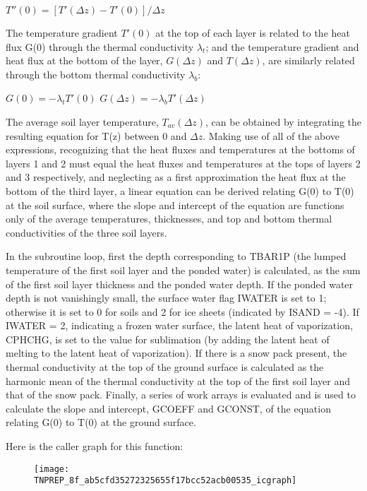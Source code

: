 $T''(0) = [T'(\Delta z) - T'(0)]/ \Delta z$

The temperature gradient $T'(0)$ at the top of each layer is related to the heat flux G(0) through the thermal conductivity $\lambda_t$; and the temperature gradient and heat flux at the bottom of the layer, $G(\Delta z)$ and $T(\Delta z)$, are similarly related through the bottom thermal conductivity $\lambda_b$\+:

$G(0) = - \lambda_t T'(0)$ $G(\Delta z) = - \lambda_b T'(\Delta z)$

The average soil layer temperature, $T_{av}(\Delta z)$, can be obtained by integrating the resulting equation for T(z) between 0 and $\Delta z$. Making use of all of the above expressions, recognizing that the heat fluxes and temperatures at the bottoms of layers 1 and 2 must equal the heat fluxes and temperatures at the tops of layers 2 and 3 respectively, and neglecting as a first approximation the heat flux at the bottom of the third layer, a linear equation can be derived relating G(0) to T(0) at the soil surface, where the slope and intercept of the equation are functions only of the average temperatures, thicknesses, and top and bottom thermal conductivities of the three soil layers.

In the subroutine loop, first the depth corresponding to T\+B\+A\+R1\+P (the lumped temperature of the first soil layer and the ponded water) is calculated, as the sum of the first soil layer thickness and the ponded water depth. If the ponded water depth is not vanishingly small, the surface water flag I\+W\+A\+T\+E\+R is set to 1; otherwise it is set to 0 for soils and 2 for ice sheets (indicated by I\+S\+A\+N\+D = -\/4). If I\+W\+A\+T\+E\+R = 2, indicating a frozen water surface, the latent heat of vaporization, C\+P\+H\+C\+H\+G, is set to the value for sublimation (by adding the latent heat of melting to the latent heat of vaporization). If there is a snow pack present, the thermal conductivity at the top of the ground surface is calculated as the harmonic mean of the thermal conductivity at the top of the first soil layer and that of the snow pack. Finally, a series of work arrays is evaluated and is used to calculate the slope and intercept, G\+C\+O\+E\+F\+F and G\+C\+O\+N\+S\+T, of the equation relating G(0) to T(0) at the ground surface.

Here is the caller graph for this function\+:\nopagebreak
\begin{figure}[H]
\begin{center}
\leavevmode
\texttt{[image: TNPREP\_8f\_ab5cfd35272325655f17bcc52acb00535\_icgraph]}
\end{center}
\end{figure}


